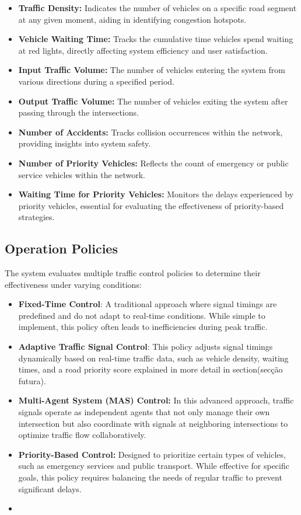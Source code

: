 \documentclass[sigconf]{acmart}
\begin{document}
\begin{itemize}
    \item \textbf{Traffic Density:} Indicates the number of vehicles on a specific road segment at any given moment, aiding in identifying congestion hotspots.
    \item \textbf{Vehicle Waiting Time:} Tracks the cumulative time vehicles spend waiting at red lights, directly affecting system efficiency and user satisfaction.
    \item \textbf{Input Traffic Volume:} The number of vehicles entering the system from various directions during a specified period.
    \item \textbf{Output Traffic Volume:} The number of vehicles exiting the system after passing through the intersections.
    \item \textbf{Number of Accidents:} Tracks collision occurrences within the network, providing insights into system safety.
    \item \textbf{Number of Priority Vehicles:} Reflects the count of emergency or public service vehicles within the network.
    \item \textbf{Waiting Time for Priority Vehicles:} Monitors the delays experienced by priority vehicles, essential for evaluating the effectiveness of priority-based strategies.
\end{itemize}

\subsection{Operation Policies}

The system evaluates multiple traffic control policies to determine their effectiveness under varying conditions:
\begin{itemize}
    \item \textbf{Fixed-Time Control}: A traditional approach where signal timings are predefined and do not adapt to real-time conditions. While simple to implement, this policy often leads to inefficiencies during peak traffic.
    \item \textbf{Adaptive Traffic Signal Control}: This policy adjusts signal timings dynamically based on real-time traffic data, such as vehicle density, waiting times, and a road priority score explained in more detail in section(secção futura).
    \item \textbf{Multi-Agent System (MAS) Control:} In this advanced approach, traffic signals operate as independent agents that not only manage their own intersection but also coordinate with signals at neighboring intersections to optimize traffic flow collaboratively.
    \item \textbf{Priority-Based Control:} Designed to prioritize certain types of vehicles, such as emergency services and public transport. While effective for specific goals, this policy requires balancing the needs of regular traffic to prevent significant delays.
    \item 
\end{itemize}
\end{document}
